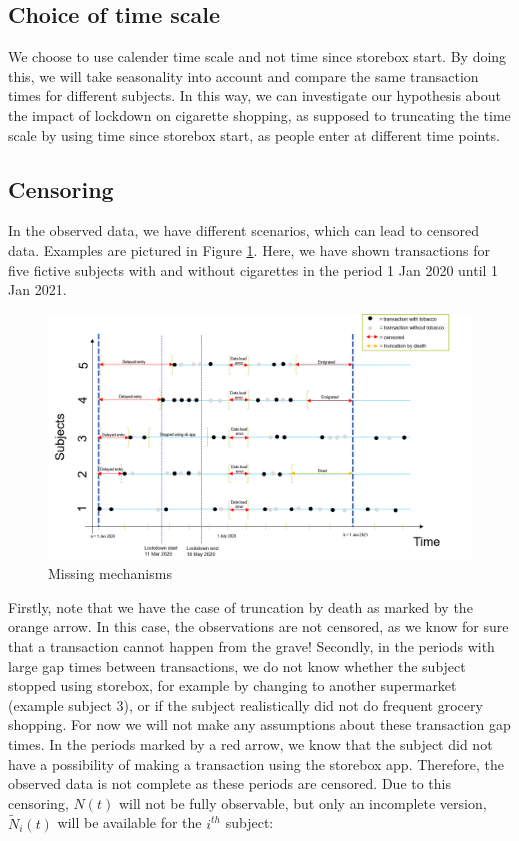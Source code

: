 \documentclass[
  11pt,
]{article}
\begin{document}
\hypertarget{choice-of-time-scale}{%
\subsection{Choice of time scale}\label{choice-of-time-scale}}

We choose to use calender time scale and not time since storebox start.
By doing this, we will take seasonality into account and compare the
same transaction times for different subjects. In this way, we can
investigate our hypothesis about the impact of lockdown on cigarette
shopping, as supposed to truncating the time scale by using time since
storebox start, as people enter at different time points.

\hypertarget{censoring}{%
\subsection{Censoring}\label{censoring}}

In the observed data, we have different scenarios, which can lead to
censored data. Examples are pictured in Figure \ref{missing}. Here, we
have shown transactions for five fictive subjects with and without
cigarettes in the period 1 Jan 2020 until 1 Jan 2021.

\begin{center}
\begin{figure}
\includegraphics[]{MissingData.png}
\caption{Missing mechanisms}
\label{missing}
\end{figure}
\end{center}

Firstly, note that we have the case of truncation by death as marked by
the orange arrow. In this case, the observations are not censored, as we
know for sure that a transaction cannot happen from the grave! Secondly,
in the periods with large gap times between transactions, we do not know
whether the subject stopped using storebox, for example by changing to
another supermarket (example subject 3), or if the subject realistically
did not do frequent grocery shopping. For now we will not make any
assumptions about these transaction gap times. In the periods marked by
a red arrow, we know that the subject did not have a possibility of
making a transaction using the storebox app. Therefore, the observed
data is not complete as these periods are censored. Due to this
censoring, \(N(t)\) will not be fully observable, but only an incomplete
version, \(\tilde{N}_i(t)\) will be available for the \(i^{th}\)
subject:
\end{document}

